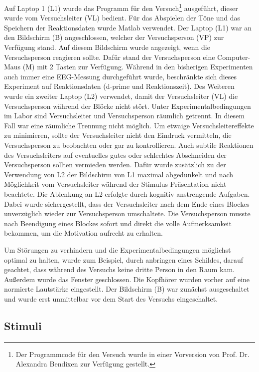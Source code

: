\documentclass[doc,a4paper,12pt]{apa6}
\begin{document}
Auf Laptop 1 (L1) wurde das Programm für den Versuch\footnote{\label{foot:1}Der Programmcode für den Versuch wurde in einer Vorversion von Prof. Dr. Alexandra Bendixen zur Verfügung gestellt.} ausgeführt, dieser wurde vom Versuchsleiter (VL) bedient. Für das Abspielen der Töne und das Speichern der Reaktionsdaten wurde Matlab verwendet. Der Laptop (L1) war an den Bildschirm (B) angeschlossen, welcher der Versuchsperson (VP) zur Verfügung stand. Auf diesem Bildschirm wurde angezeigt, wenn die Versuchsperson reagieren sollte. Dafür stand der Versuchsperson eine Computer-Maus (M) mit 2 Tasten zur Verfügung. Während in den bisherigen Experimenten auch immer eine EEG-Messung durchgeführt wurde, beschränkte sich dieses Experiment auf Reaktionsdaten (d-prime und Reaktionszeit). Des Weiteren wurde ein zweiter Laptop (L2) verwendet, damit der Versuchsleiter (VL) die Versuchsperson während der Blöcke nicht stört. Unter Experimentalbedingungen im Labor sind Versuchsleiter und Versuchsperson räumlich getrennt. In diesem Fall war eine räumliche Trennung nicht möglich. Um etwaige Versuchsleitereffekte zu minimieren, sollte der Versuchsleiter nicht den Eindruck vermitteln, die Versuchsperson zu beobachten oder gar zu kontrollieren. Auch subtile Reaktionen des Versuchsleiters auf eventuelles gutes oder schlechtes Abschneiden der Versuchsperson sollten vermieden werden. Dafür wurde zusätzlich zu der Verwendung von L2 der Bildschirm von L1 maximal abgedunkelt und nach Möglichkeit vom Versuchsleiter während der Stimulus-Präsentation nicht beachtete. Die Ablenkung an L2 erfolgte durch kognitiv anstrengende Aufgaben. Dabei wurde sichergestellt, dass der Versuchsleiter nach dem Ende eines Blockes unverzüglich wieder zur Versuchsperson umschaltete. Die Versuchsperson musste nach Beendigung eines Blockes sofort und direkt die volle Aufmerksamkeit bekommen, um die Motivation aufrecht zu erhalten.

Um Störungen zu verhindern und die Experimentalbedingungen möglichst optimal zu halten, wurde zum Beispiel, durch anbringen eines Schildes, darauf geachtet, dass während des Versuchs keine dritte Person in den Raum kam. Außerdem wurde das Fenster geschlossen. Die Kopfhörer wurden vorher auf eine normierte Lautstärke eingestellt. Der Bildschirm (B) war zunächst ausgeschaltet und wurde erst unmittelbar vor dem Start des Versuchs eingeschaltet.

\subsection{Stimuli}
\end{document}
